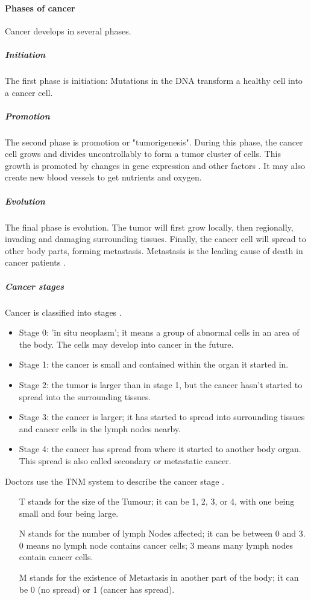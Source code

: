\paragraph{Phases of cancer}
Cancer develops in several phases.
\subparagraph{Initiation}
The first phase is initiation: 
Mutations in the DNA transform a healthy cell into a cancer cell.
\subparagraph{Promotion}
The second phase is promotion or "tumorigenesis".
During this phase, the cancer cell grows and divides uncontrollably to form a tumor cluster of cells.
This growth is promoted by changes in gene expression and other factors \cite{Witsch2010}.
It may also create new blood vessels to get nutrients and oxygen.
\subparagraph{Evolution}
The final phase is evolution.
The tumor will first grow locally, then regionally, invading and damaging surrounding tissues.
Finally, the cancer cell will spread to other body parts, forming metastasis.
Metastasis is the leading cause of death in cancer patients \cite{Steeg2006}.

\subparagraph{Cancer stages}
Cancer is classified into stages \cite{cancerresearchuk2023}.
\begin{itemize}
	\item Stage 0: 'in situ neoplasm'; it means a group of abnormal cells in an area of the body. The cells may develop into cancer in the future.
	\item Stage 1: the cancer is small and contained within the organ it started in.
	\item Stage 2: the tumor is larger than in stage 1, but the cancer hasn't started to spread into the surrounding tissues.
	\item Stage 3: the cancer is larger; it has started to spread into surrounding tissues and cancer cells in the lymph nodes nearby.
	\item Stage 4: the cancer has spread from where it started to another body organ. This spread is also called secondary or metastatic cancer.
\end{itemize}
Doctors use the TNM system to describe the cancer stage \cite{Brierley2016}.
\begin{itemize}
	\item [T] stands for the size of the Tumour;
	it can be 1, 2, 3, or 4, with one being small and four being large.
	\item [N] stands for the number of lymph Nodes affected;
	it can be between 0 and 3.
	0 means no lymph node contains cancer cells; 3 means many lymph nodes contain cancer cells.
	\item [M] stands for the existence of Metastasis in another part of the body;
	it can be 0 (no spread) or 1 (cancer has spread).
\end{itemize}

